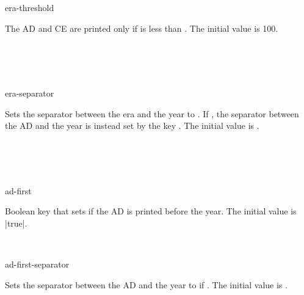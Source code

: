 \documentclass{beerydoc}
\begin{document}
\begin{codedoc}{era-threshold}
  \begin{syntax}
  \end{syntax}
  The AD and CE are printed only if  is less than .
  The initial value is \num{100}.
  \begin{codedemo}
    \\
    \\
    \\
  \end{codedemo}
\end{codedoc}

\begin{codedoc}{era-separator}
  \begin{syntax}
  \end{syntax}
  Sets the separator between the era and the year to .
  If , the separator between the AD and the year is instead
  set by the key .
  The initial value is .
  \begin{codedemo}
    \\
    \\
    \\
  \end{codedemo}
\end{codedoc}

\begin{codedoc}{ad-first}
  \begin{syntax}
  \end{syntax}
  Boolean key that sets if the AD is printed before the year.
  The initial value is |true|.
  \begin{codedemo}
    \\
  \end{codedemo}
\end{codedoc}

\begin{codedoc}{ad-first-separator}
  \begin{syntax}
  \end{syntax}
  Sets the separator between the AD and the year to  if
  .
  The initial value is .
  \begin{codedemo}
    \\
  \end{codedemo}
\end{codedoc}
\end{document}
